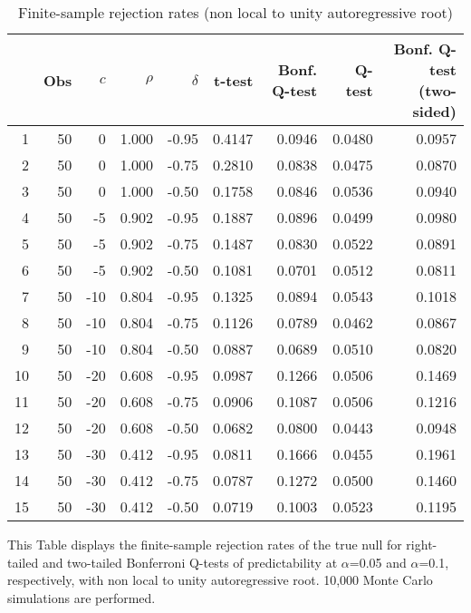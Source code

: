 \documentclass{article}
\begin{document}
\begin{table}[h!]
\caption{Finite-sample rejection rates (non local to unity autoregressive root) }
\label{tab:non-local}
\centering
\begin{threeparttable}
\begin{tabular}{rrrrrrrrr}
  \hline
 & Obs & $c$ & $\rho$ & $\delta$ & t-test & Bonf. Q-test & Q-test & Bonf. Q-test (two-sided) \\ 
  \hline
1 & 50 & 0 & 1.000 & -0.95 & 0.4147 & 0.0946 & 0.0480 & 0.0957 \\ 
  2 & 50 & 0 & 1.000 & -0.75 & 0.2810 & 0.0838 & 0.0475 & 0.0870 \\ 
  3 & 50 & 0 & 1.000 & -0.50 & 0.1758 & 0.0846 & 0.0536 & 0.0940 \\ 
  4 & 50 & -5 & 0.902 & -0.95 & 0.1887 & 0.0896 & 0.0499 & 0.0980 \\ 
  5 & 50 & -5 & 0.902 & -0.75 & 0.1487 & 0.0830 & 0.0522 & 0.0891 \\ 
  6 & 50 & -5 & 0.902 & -0.50 & 0.1081 & 0.0701 & 0.0512 & 0.0811 \\ 
  7 & 50 & -10 & 0.804 & -0.95 & 0.1325 & 0.0894 & 0.0543 & 0.1018 \\ 
  8 & 50 & -10 & 0.804 & -0.75 & 0.1126 & 0.0789 & 0.0462 & 0.0867 \\ 
  9 & 50 & -10 & 0.804 & -0.50 & 0.0887 & 0.0689 & 0.0510 & 0.0820 \\ 
  10 & 50 & -20 & 0.608 & -0.95 & 0.0987 & 0.1266 & 0.0506 & 0.1469 \\ 
  11 & 50 & -20 & 0.608 & -0.75 & 0.0906 & 0.1087 & 0.0506 & 0.1216 \\ 
  12 & 50 & -20 & 0.608 & -0.50 & 0.0682 & 0.0800 & 0.0443 & 0.0948 \\ 
  13 & 50 & -30 & 0.412 & -0.95 & 0.0811 & 0.1666 & 0.0455 & 0.1961 \\ 
  14 & 50 & -30 & 0.412 & -0.75 & 0.0787 & 0.1272 & 0.0500 & 0.1460 \\ 
  15 & 50 & -30 & 0.412 & -0.50 & 0.0719 & 0.1003 & 0.0523 & 0.1195 \\ 
   \hline
\end{tabular}
 \begin{tablenotes}
 \small
\item This Table displays the finite-sample rejection rates of the true null for right-tailed and two-tailed Bonferroni Q-tests of predictability at $\alpha$=0.05 and $\alpha$=0.1, respectively, with non local to unity autoregressive root. 10,000 Monte Carlo simulations are performed.
\end{tablenotes}
\end{threeparttable}
\end{table}
\end{document}
